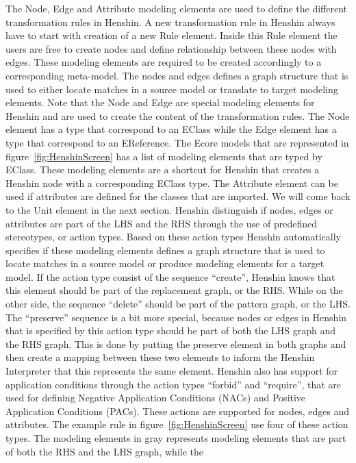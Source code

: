 The Node, Edge and Attribute modeling elements are used to define the different
transformation rules in Henshin. A new transformation rule in Henshin always
have to start with creation of a new Rule element. Inside this Rule element the
users are free to create nodes and define relationship between these nodes with
edges. These modeling elements are required to be created accordingly to a
corresponding meta-model.
The nodes and edges defines a graph structure that is used to either locate
matches in a source model or translate to target modeling elements. 
Note that the Node and Edge are special modeling elements for Henshin and are
used to create the content of the transformation rules. The Node element has a
type that correspond to an EClass while the Edge element has a type that
correspond to an EReference. The Ecore models that are represented in
figure~\ref{fig:HenshinScreen} has a list of modeling elements that are typed
by EClass. These modeling elements are a shortcut for Henshin that creates a
Henshin node with a corresponding EClass type. The Attribute element can be used
if attributes are defined for the classes that are imported. We will come back to
the Unit element in the next section. Henshin distinguish if nodes, edges or
attributes are part of the LHS and the RHS through the use of predefined
stereotypes, or action types. Based on these action types Henshin automatically
specifies if these modeling elements defines a graph structure that is used to
locate matches in a source model or produce modeling elements for a target
model. If the action type consist of the sequence ``create'', Henshin knows
that this element should be part of the replacement graph, or the RHS. While on
the other side, the sequence ``delete'' should be part of the pattern graph, or
the LHS. The ``preserve'' sequence is a bit more special, because nodes or
edges in Henshin that is specified by this action type should be part of both
the LHS graph and the RHS graph. This is done by putting the preserve element
in both graphs and then create a mapping between these two elements to inform
the Henshin Interpreter that this represents the same element. Henshin also has
support for application conditions through the action types ``forbid'' and
``require'', that are used for defining Negative Application Conditions (NACs)
and Positive Application Conditions (PACs). These actions are supported for
nodes, edges and attributes. The example rule in figure~\ref{fig:HenshinScreen}
use four of these action types. The modeling elements in gray represents
modeling elements that are part of both the RHS and the LHS graph, while the
